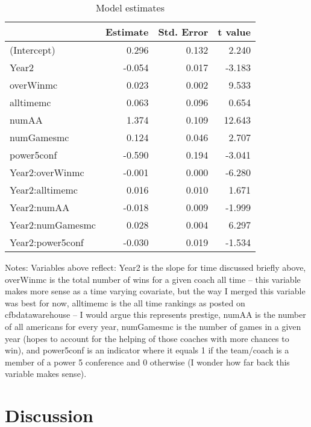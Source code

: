 \documentclass[letterpaper,12pt]{article}
\begin{document}
\begin{table}[ht]
\centering
\caption{Model estimates} 
\begin{tabular}{lrrr}
  \toprule
 & Estimate & Std. Error & t value \\ 
  \midrule
(Intercept) & 0.296 & 0.132 & 2.240 \\ 
  Year2 & -0.054 & 0.017 & -3.183 \\ 
  overWinmc & 0.023 & 0.002 & 9.533 \\ 
  alltimemc & 0.063 & 0.096 & 0.654 \\ 
  numAA & 1.374 & 0.109 & 12.643 \\ 
  numGamesmc & 0.124 & 0.046 & 2.707 \\ 
  power5conf & -0.590 & 0.194 & -3.041 \\ 
  Year2:overWinmc & -0.001 & 0.000 & -6.280 \\ 
  Year2:alltimemc & 0.016 & 0.010 & 1.671 \\ 
  Year2:numAA & -0.018 & 0.009 & -1.999 \\ 
  Year2:numGamesmc & 0.028 & 0.004 & 6.297 \\ 
  Year2:power5conf & -0.030 & 0.019 & -1.534 \\ 
   \bottomrule
\end{tabular}
\end{table}

Notes: Variables above reflect: Year2 is the slope for time discussed briefly above, overWinmc is the total number of wins for a given coach all time -- this variable makes more sense as a time varying covariate, but the way I merged this variable was best for now, alltimemc is the all time rankings as posted on cfbdatawarehouse -- I would argue this represents prestige, numAA is the number of all americans for every year, numGamesmc is the number of games in a given year (hopes to account for the helping of those coaches with more chances to win), and power5conf is an indicator where it equals 1 if the team/coach is a member of a power 5 conference and 0 otherwise (I wonder how far back this variable makes sense).

\section{Discussion}



\end{document}
